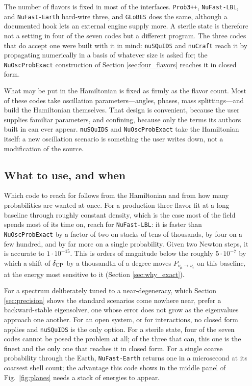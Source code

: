 \documentclass[final,5p,times,twocolumn,sort,compress]{elsarticle}
\newcommand{\fig}{Fig.}
\newcommand{\figu}[1]{\fig~\ref{fig:#1}}
\begin{document}
The number of flavors is fixed in most of the interfaces.  {\tt Prob3++}, {\tt NuFast-LBL}, and {\tt NuFast-Earth} hard-wire three, and {\tt GLoBES} does the same, although a documented hook lets an external engine supply more.  A sterile state is therefore not a setting in four of the seven codes but a different program.  The three codes that do accept one were built with it in mind: {\tt nuSQuIDS} and {\tt nuCraft} reach it by propagating numerically in a basis of whatever size is asked for; the {\tt NuOscProbExact} construction of Section \ref{sec:four_flavors} reaches it in closed form.

What may be put in the Hamiltonian is fixed as firmly as the flavor count.  Most of these codes take oscillation parameters---angles, phases, mass splittings---and build the Hamiltonian themselves.  That design is convenient, because the user supplies familiar parameters, and confining, because only the terms its authors built in can ever appear.  {\tt nuSQuIDS} and {\tt NuOscProbExact} take the Hamiltonian itself: a new oscillation scenario is something the user writes down, not a modification of the source.  


\subsection{What to use, and when}
\label{sec:what_to_use}

Which code to reach for follows from the Hamiltonian and from how many probabilities are wanted at once.  For a production three-flavor fit at a long baseline through roughly constant density, which is the case most of the field spends most of its time on, reach for {\tt NuFast-LBL}: it is faster than {\tt NuOscProbExact} by a factor of two on stacks of tens of thousands, by four on a few hundred, and by far more on a single probability.  Given two Newton steps, it is accurate to $1 \cdot 10^{-15}$.  This is orders of magnitude below the roughly $5 \cdot 10^{-7}$ by which a shift of $\delta_{\rm CP}$ by a thousandth of a degree moves $P_{\nu_\mu \to \nu_e}$ on this baseline, at the energy most sensitive to it (Section \ref{sec:why_exact}).

For a spectrum deliberately tuned to a near-degeneracy, which Section \ref{sec:precision} shows the standard scenarios come nowhere near, prefer a backward-stable eigensolver, one whose error does not grow as the eigenvalues approach one another.  For an open system, or for interactions, no closed form applies and {\tt nuSQuIDS} is the only option.  For a sterile state, four of the seven codes cannot be posed the problem at all; of the three that can, this one is the finest and the only one that reaches it in closed form.  For a single coarse probability through the Earth, {\tt NuFast-Earth} returns one in a microsecond at its coarsest shell count; the advantage this code shows in the middle panel of \figu{planes} needs a stack of energies to appear.
\end{document}
